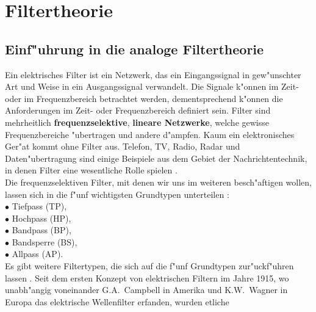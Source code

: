 \renewcommand{\thesection}{\thechapter.\arabic{section}}
\setcounter{Aufgabe}{0}\setcounter{Beispiel}{0}
\chapter{Filtertheorie}\label{Kapitel_Filter}
\section{Einf"uhrung in die analoge Filtertheorie}
Ein elektrisches Filter ist ein Netzwerk, das ein Eingangssignal in
gew"unschter Art und Weise in ein Ausgangssignal verwandelt. Die
Signale k"onnen im Zeit- oder im Frequenzbereich betrachtet werden,
dementsprechend k"onnen die Anforderungen im Zeit- oder
Frequenzbereich definiert sein. Filter sind mehrheitlich
{\bf frequenzselektive}, {\bf lineare Netzwerke}, welche gewisse Frequenzbereiche
"ubertragen und andere d"ampfen. Kaum ein elektronisches Ger"at kommt
ohne Filter aus.  Telefon, TV, Radio,
Radar und Daten"ubertragung sind einige Beispiele aus dem Gebiet der
Nachrichtentechnik, in denen Filter eine wesentliche Rolle spielen
\cite{MOS:89}.\\ Die frequenzselektiven Filter, mit denen wir uns im
weiteren besch"aftigen wollen, lassen sich in die f"unf wichtigsten
Grundtypen unterteilen \cite{ZVE:67}:\vspace*{3mm} \\ 
\hspace*{2cm}$\bullet$ Tiefpass (TP),\\
\hspace*{2cm}$\bullet$ Hochpass (HP),\\
\hspace*{2cm}$\bullet$ Bandpass (BP),\\
\hspace*{2cm}$\bullet$ Bandsperre (BS),\\
\hspace*{2cm}$\bullet$ Allpass (AP).\vspace*{3mm} \\ 
Es gibt weitere Filtertypen, die sich auf die f"unf %
Grundtypen zur"uck\-f"uhren lassen \cite{SCH:VAL:01}.  Seit dem ersten
Konzept von elektrischen Filtern im Jahre 1915, wo unabh"angig
voneinander G.A.~Campbell in Amerika und K.W.~Wagner in Europa das
elektrische Wellenfilter erfanden, wurden etliche

